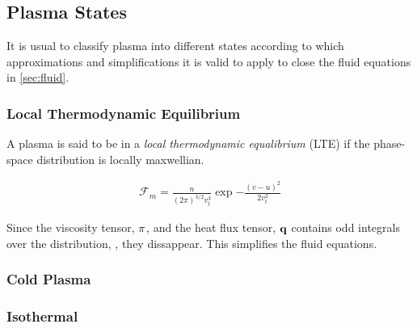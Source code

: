 \subsection{Plasma States}
	It is usual to classify plasma into different states according to which
	approximations and simplifications it is valid to apply to close the fluid equations in \cref{sec:fluid}.

	\subsubsection{Local Thermodynamic Equilibrium}
	A plasma is said to be in a \textit{local thermodynamic equalibrium} (LTE)
	if the phase-space distribution is locally maxwellian.

	\begin{align}
		\mathcal{F}_m = \frac{n}{(2\pi )^{3/2}v_t^3} \exp{-\frac{(v-u)^2}{2v_t^2}}
	\end{align}

	Since the viscosity tensor, \(\vb{\pi}\), and the heat flux tensor, \(\vb{q}\)
	contains odd integrals over the distribution, \textit{},
	they dissappear. This simplifies the fluid equations.


	\subsubsection{Cold Plasma}

	\subsubsection{Isothermal}

